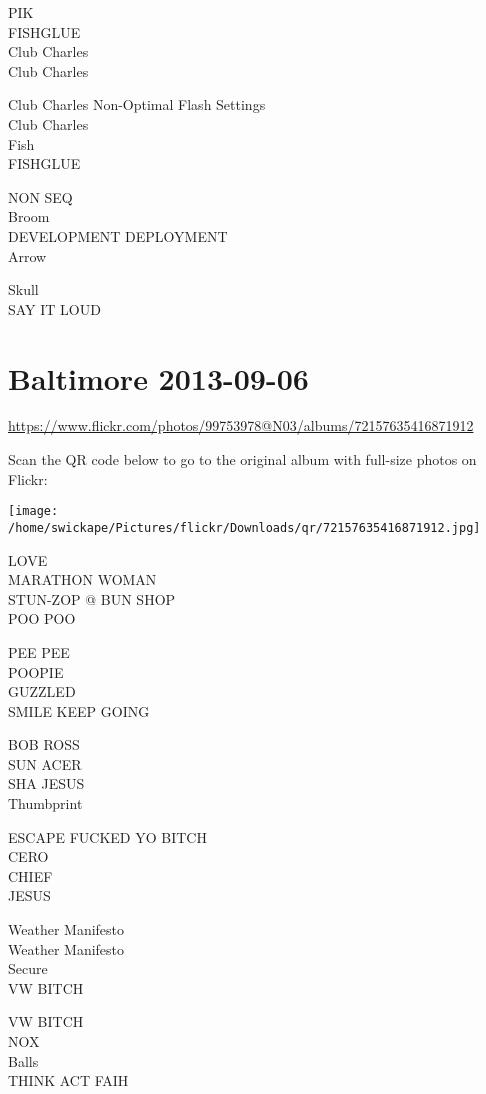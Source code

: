 \documentclass[10pt,letterpaper]{article}
\begin{document}
PIK\\
FISHGLUE\\
Club Charles\\
Club Charles

Club Charles Non{-}Optimal Flash Settings\\
Club Charles\\
Fish\\
FISHGLUE

NON SEQ\\
Broom\\
DEVELOPMENT DEPLOYMENT\\
Arrow

Skull\\
SAY IT LOUD


\section*{Baltimore 2013-09-06}

\url{https://www.flickr.com/photos/99753978@N03/albums/72157635416871912}

Scan the QR code below to go to the original album with full-size photos on Flickr:

\texttt{[image: /home/swickape/Pictures/flickr/Downloads/qr/72157635416871912.jpg]}


LOVE\\
MARATHON WOMAN\\
STUN{-}ZOP @ BUN SHOP\\
POO POO

PEE PEE\\
POOPIE\\
GUZZLED\\
SMILE KEEP GOING

BOB ROSS\\
SUN ACER\\
SHA JESUS\\
Thumbprint

ESCAPE FUCKED YO BITCH\\
CERO\\
CHIEF\\
JESUS

Weather Manifesto\\
Weather Manifesto\\
Secure\\
VW BITCH

VW BITCH\\
NOX\\
Balls\\
THINK ACT FAIH
\end{document}
